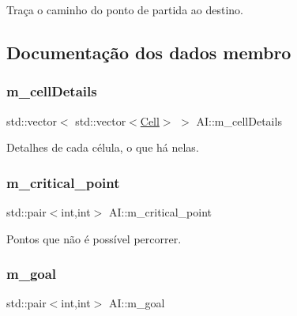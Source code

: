 Traça o caminho do ponto de partida ao destino. 



\subsection{Documentação dos dados membro}
\mbox{\label{classAI_a76b2682dd63290bcd1e095acc8d67327}} 
\subsubsection{\texorpdfstring{m\+\_\+cell\+Details}{m\_cellDetails}}
{\footnotesize\ttfamily std\+::vector$<$ std\+::vector$<$\hyperlink{structCell}{Cell}$>$ $>$ A\+I\+::m\+\_\+cell\+Details\hspace{0.3cm}{\ttfamily [private]}}



Detalhes de cada célula, o que há nelas. 

\mbox{\label{classAI_aad8433aa1c9caa89539d64ece68326b7}} 
\subsubsection{\texorpdfstring{m\+\_\+critical\+\_\+point}{m\_critical\_point}}
{\footnotesize\ttfamily std\+::pair$<$int,int$>$ A\+I\+::m\+\_\+critical\+\_\+point\hspace{0.3cm}{\ttfamily [private]}}



Pontos que não é possível percorrer. 

\mbox{\label{classAI_a7ba53175395b1ee06740384962980ea3}} 
\subsubsection{\texorpdfstring{m\+\_\+goal}{m\_goal}}
{\footnotesize\ttfamily std\+::pair$<$int,int$>$ A\+I\+::m\+\_\+goal\hspace{0.3cm}{\ttfamily [private]}}



